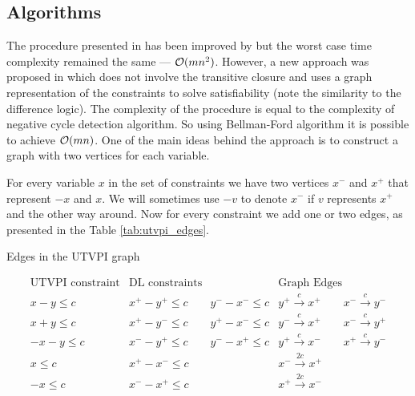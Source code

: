 \subsection{Algorithms}

The procedure presented in \cite{bib:beyond_finite} has been improved by
\cite{bib:harvey_stuckey} but the worst case time complexity remained the same
--- $\mathcal{O}(m n^2)$. However, a new approach was proposed in \cite{bib:ms_utvpi}
which does not involve the transitive closure and uses a graph representation of
the constraints to solve satisfiability (note the similarity to the difference
logic). The complexity of the procedure is equal to the complexity of negative
cycle detection algorithm. So using Bellman-Ford algorithm it is possible to
achieve $\mathcal{O}(m n)$. One of the main ideas behind the approach is to construct
a graph with two vertices for each variable.

For every variable $x$ in the set of constraints we have two vertices $x^-$ and
$x^+$ that represent $-x$ and $x$. We will sometimes use $-v$ to denote $x^-$ if
$v$ represents $x^+$ and the other way around. Now for every constraint we add
one or two edges, as presented in the Table \ref{tab:utvpi_edges}.

\begin{table}
\caption{Edges in the UTVPI graph}
\label{tab:utvpi_edges}
\[
\begin{array}{c|c|c}
\textrm{UTVPI constraint} & \textrm{DL constraints} & \textrm{Graph Edges} \\
\hline \hline
x - y \leq c &
  x^+ - y^+ \leq c        \qquad y^- - x^- \leq c &
  y^+ \xrightarrow{c} x^+ \qquad x^- \xrightarrow{c} y^- \\
\hline
x + y \leq c &
  x^+ - y^- \leq c        \qquad y^+ - x^- \leq c &
  y^- \xrightarrow{c} x^+ \qquad x^- \xrightarrow{c} y^+ \\
\hline
- x - y \leq c &
  x^- - y^+ \leq c        \qquad y^- - x^+ \leq c &
  y^+ \xrightarrow{c} x^- \qquad x^+ \xrightarrow{c} y^- \\
\hline
x \leq c &
  x^+ - x^- \leq c &
  x^- \xrightarrow{2c} x^+ \\
\hline
-x \leq c &
  x^- - x^+ \leq c &
  x^+ \xrightarrow{2c} x^- \\
\end{array}
\]
\end{table}

